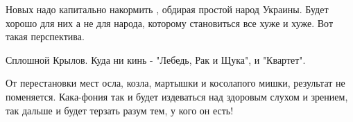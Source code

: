 \begin{itemize}
Новых надо капитально накормить , обдирая простой народ Украины. Будет хорошо
для них а не для народа, которому становиться все хуже и хуже. Вот такая
перспектива.


 
Сплошной Крылов. Куда ни кинь - "Лебедь, Рак и Щука", и "Квартет".

 

От перестановки мест осла, козла, мартышки и косолапого мишки, результат не
поменяется. Кака-фония так и будет издеваться над здоровым слухом и зрением, так
дальше и будет терзать разум тем, у кого он есть!

\end{itemize}

